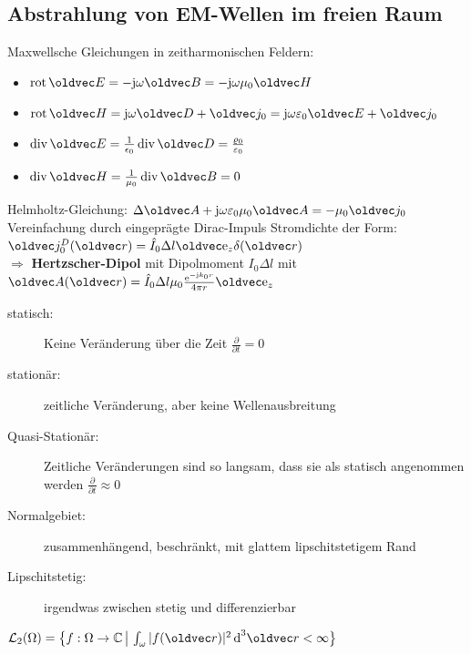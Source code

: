 \documentclass[6pt,a4paper]{scrartcl}
\let\vec\oldvec
\begin{document}
\begin{multicols}{4}
	\subsection{Abstrahlung von EM-Wellen im freien Raum}
	Maxwellsche Gleichungen in zeitharmonischen Feldern:
	\begin{itemize}
		\item $\rot\vec E = -\j\omega\vec B = -\j\omega\mu_0\vec H$
		\item $\rot\vec H = \j\omega\vec D + \vec j_0 = \j\omega\varepsilon_0\vec E+\vec j_0$
		\item $\div\vec E = \frac{1}{\epsilon_0}\div\vec D = \frac{\varrho_0}{\varepsilon_0}$
		\item $\div\vec H = \frac{1}{\mu_0}\div\vec B = 0$
	\end{itemize}
	Helmholtz-Gleichung: $\Delta\vec A + \j\omega\varepsilon_0\mu_0\vec A = -\mu_0\vec j_0$\\
	Vereinfachung durch eingeprägte Dirac-Impuls Stromdichte der Form: $\vec j_0^D(\vec  r) = \hat I_0\Delta l\vec\e_z\delta(\vec r)$\\
	$\Rightarrow$ \textbf{Hertzscher-Dipol} mit Dipolmoment $I_0\Delta l$ mit $\vec A(\vec r) = \hat I_0\Delta l\mu_0\frac{\e^{-\j k_0r}}{4\pi r}\vec\e_z$\\
	
	\begin{description}
		\item[statisch:] Keine Veränderung über die Zeit $\frac{\partial}{\partial t} = 0$
		\item[stationär:] zeitliche Veränderung, aber keine Wellenausbreitung
		\item[Quasi-Stationär:] Zeitliche Veränderungen sind so langsam, dass sie als statisch angenommen werden $\frac{\partial}{\partial t} \approx 0$
		\item[Normalgebiet:] zusammenhängend, beschränkt, mit glattem lipschitstetigem Rand
		\item[Lipschitstetig:] irgendwas zwischen stetig und differenzierbar
	\end{description}
	$\mathcal L_2(\Omega) = \iset{f:\Omega \ra \C}{\int_\omega |f(\vec r)|^2 \diff^3 \vec r < \infty }$\\
	
	
	

\end{multicols}
\end{document}
